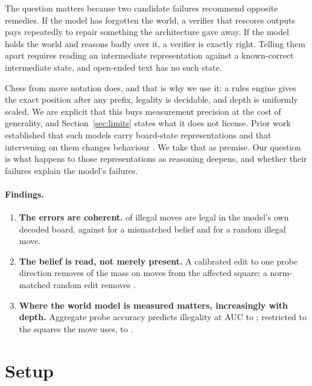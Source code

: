 \documentclass[10pt]{article}
\begin{document}
The question matters because two candidate failures recommend opposite remedies.
If the model has forgotten the world, a verifier that rescores outputs pays
repeatedly to repair something the architecture gave away. If the model holds the
world and reasons badly over it, a verifier is exactly right. Telling them apart
requires reading an intermediate representation against a known-correct
intermediate state, and open-ended text has no such state.

Chess from move notation does, and that is why we use it: a rules engine gives
the exact position after any prefix, legality is decidable, and depth is
uniformly scaled. We are explicit that this buys measurement precision at the
cost of generality, and Section~\ref{sec:limits} states what it does not license.
Prior work established that such models carry board-state representations and
that intervening on them changes behaviour \citep{li2023emergent,
karvonen2024emergent, toshniwal2022chess}. We take that as premise. Our question
is what happens to those representations as reasoning deepens, and whether their
failures explain the model's failures.

\paragraph{Findings.}
\begin{enumerate}[nosep,leftmargin=*]
\item \textbf{The errors are coherent.}  of illegal moves are
legal in the model's own decoded board, against  for a
mismatched belief and  for a random illegal move.
\item \textbf{The belief is read, not merely present.} A calibrated edit to one
probe direction removes  of the mass on moves from the
affected square; a norm-matched random edit removes .
\item \textbf{Where the world model is measured matters, increasingly with
depth.} Aggregate probe accuracy predicts illegality at AUC  to
; restricted to the squares the move uses,
 to .
\end{enumerate}

\section{Setup}
\label{sec:setup}
\end{document}
